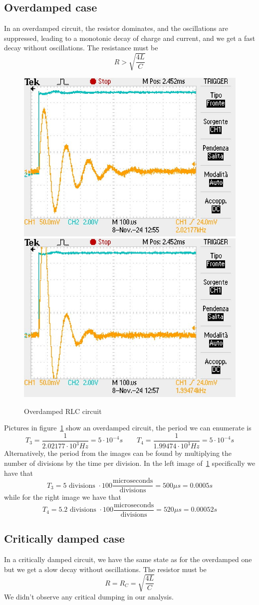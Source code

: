 \documentclass[notitlepage]{report}
\numberwithin{equation}{section}
\theoremstyle{plain}
\theoremstyle{definition}
\theoremstyle{remark}
\begin{document}
\subsection{Overdamped case}
In an overdamped circuit, the resistor dominates, and the oscillations are
suppressed, leading to a monotonic decay of charge and current, and we get a
fast decay without oscillations. The resistance must be
\[
  R > \sqrt{\frac{4L}{C}}
\]
\begin{figure}[h!]
    \centering
    \includegraphics[width=0.45\linewidth]{figures/RLC_graph_3.jpg}
    \includegraphics[width=0.45\linewidth]{figures/RLC_graph_4.jpg}
    \caption{Overdamped RLC circuit}\label{fig:overdamped}
\end{figure}

Pictures in figure~\ref{fig:overdamped} show an overdamped circuit, the period
we can enumerate is
\[
  T_{3} = \frac{1}{2.02177 \cdot 10^{3} Hz} = 5\cdot 10^{-4} s \quad \quad T_{4}=
  \frac{1}{1.99474 \cdot 10^{3} Hz} = 5\cdot 10^{-4}s
\]
Alternatively, the period from the images can be found by multiplying the number
of divisions by the time per division. In the left image of~\ref{fig:overdamped}
specifically we have that
\[
    T_{3} = 5 \text{ divisions } \cdot  100
    \frac{\text{microseconds}}{\text{divisions}} = 500 \mu s = 0.0005 s
\]
while for the right image we have that
\[
    T_{4} = 5.2 \text{ divisions } \cdot  100
    \frac{\text{microseconds}}{\text{divisions}} = 520 \mu s = 0.00052 s
\]

\subsection{Critically damped case}
In a critically damped circuit, we have the same state as for the overdamped one
but we get a slow decay without oscillations. The resistor must be
\[
    R = R_C = \sqrt{\frac{4L}{C}}
\]
We didn't observe any critical dumping in our analysis.
\end{document}

